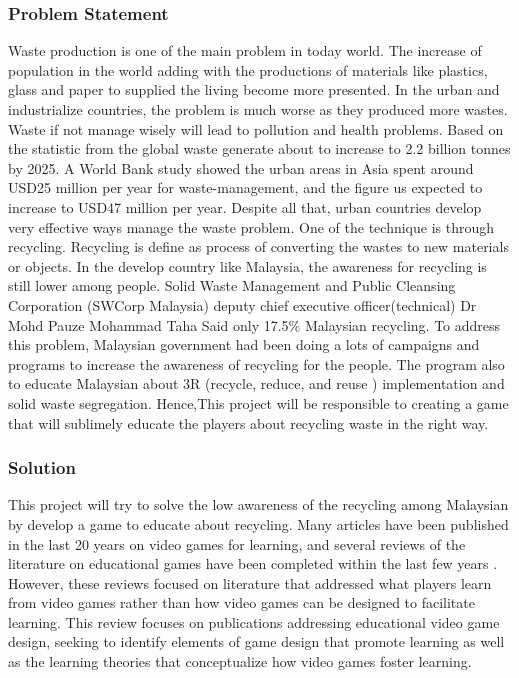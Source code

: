 \documentclass[12pt]{article}
\begin{document}
\par


\subsubsection{Problem Statement}

Waste production is one of the main problem in today world. The increase of population in the world adding with the productions of materials like plastics, glass and paper to supplied the living become more presented. In the urban and industrialize countries, the problem is much worse as they produced more wastes. Waste if not manage wisely will lead to pollution and health problems. Based on the statistic from \cite{wastemanagement} the global waste generate about to increase to 2.2 billion tonnes by 2025. A World Bank study showed the urban areas in Asia spent around USD25 million per year for waste-management, and the figure us expected to increase to USD47 million per year. Despite all that, urban countries develop  very effective ways manage the waste problem. One of the technique is through recycling. Recycling is define as process of converting the wastes to new materials or objects. In the develop country like Malaysia, the awareness for recycling is still lower among people. Solid Waste Management and Public Cleansing Corporation (SWCorp Malaysia) deputy chief executive officer(technical) Dr Mohd Pauze Mohammad Taha Said only 17.5\% Malaysian recycling. To address this problem,  Malaysian government had been doing a lots of campaigns and programs to increase the awareness of recycling for the people. The program also to educate Malaysian about 3R (recycle, reduce, and reuse ) implementation and solid waste segregation. Hence,This project will be responsible to creating a game that will sublimely educate the players about recycling waste in the right way.

\subsubsection{Solution}

This project will try to solve the low awareness of the recycling among Malaysian by develop a game to educate about recycling. Many articles have been published in the last 20 years on video games for learning, and several reviews of the literature on educational games have been completed within the last few years . However, these reviews focused on literature that addressed what players learn from video games rather than how video games can be designed to facilitate learning. This review focuses on publications addressing educational video game design, seeking to identify elements of game design that promote learning as well as the learning theories that conceptualize how video games foster learning.
\end{document}
